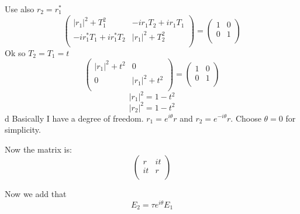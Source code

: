 Use also $r_2=r^*_1$
\begin{equation}
\begin{pmatrix}
|r_1|^2+T_1^2 & -ir_1T_2+ir_1T_1 \\
-ir^*_1T_1+ir^*_1T_2 & |r_1|^2+T_2^2 \\
\end{pmatrix}=
\begin{pmatrix}
1 & 0 \\
0 & 1 \\
\end{pmatrix}
\end{equation}
Ok so $T_2=T_1=t$
\begin{equation}
\begin{pmatrix}
|r_1|^2+t^2 & 0 \\
0 & |r_1|^2+t^2 \\
\end{pmatrix}=
\begin{pmatrix}
1 & 0 \\
0 & 1 \\
\end{pmatrix}
\end{equation}
\begin{equation}
|r_1|^2=1-t^2
\end{equation}
\begin{equation}
|r_2|^2=1-t^2
\end{equation}d
Basically I have a degree of freedom. $r_1=e^{i\theta}r$ and $r_2=e^{-i\theta}r$. Choose $\theta = 0$ for simplicity.

Now the matrix is:
\begin{equation}
\begin{pmatrix}
r & it \\
it & r \\
\end{pmatrix}
\end{equation}

Now we add that $$E_2=\tau e^{i\theta}E_1$$

